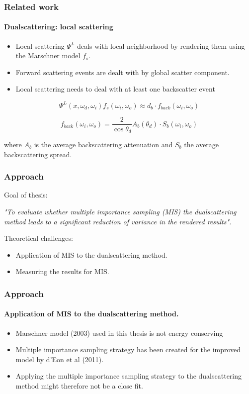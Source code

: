 \documentclass{beamer}
\begin{document}
   \begin{frame}
    \frametitle{Related work}
    \framesubtitle{Dualscattering: local scattering}

\begin{itemize}    
\item Local scattering $\Psi^L$ deals with local neighborhood by rendering them using the Marschner model $f_s$.
\item Forward scattering events are dealt with by global scatter component.
\item Local scattering needs to deal with at least one backscatter event
\end{itemize}

\begin{equation}
\Psi^L(x, \omega_d, \omega_i) f_s(\omega_i,\omega_o) \approx d_b \cdot f_{back}(\omega_i, \omega_o)
\end{equation}

\begin{equation}
f_{back}(\omega_i, \omega_o) = \frac{2}{\cos \theta_d} A_b(\theta_d) \cdot S_b(\omega_i, \omega_o)
\end{equation}

where $A_b$ is the average backscattering attenuation and $S_b$ the average backscattering spread.
    
  \end{frame}
  
  \begin{frame}
    \frametitle{Approach}
	Goal of thesis:
	
	\begin{center}
	\textit{"To evaluate whether multiple importance sampling (MIS) the dualscattering method leads to a significant reduction of variance in the rendered results".}
	\end{center}
	
	Theoretical challenges:
	\begin{itemize}
	\item Application of MIS to the dualscattering method.
	\item Measuring the results for MIS.
	\end{itemize}
	
  \end{frame}
  
  \begin{frame}
  \frametitle{Approach}
  \framesubtitle{Application of MIS to the dualscattering method.}
  
  \begin{itemize}
  \item Marschner model (2003) used in this thesis is not energy conserving
  \item Multiple importance sampling strategy has been created for the improved model by d'Eon et al (2011).
  \item Applying the multiple importance sampling strategy to the dualscattering method might therefore not be a close fit.
  \end{itemize}
  \end{frame}
  
\end{document}
